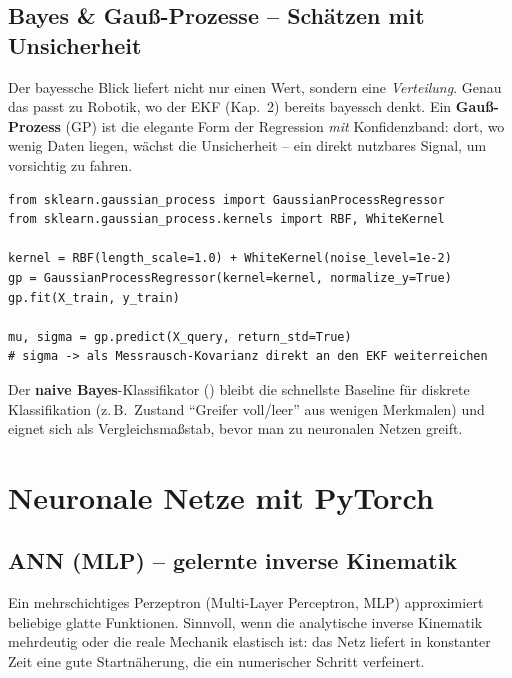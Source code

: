 \subsection{Bayes \& Gauß-Prozesse -- Schätzen mit Unsicherheit}
Der bayessche Blick liefert nicht nur einen Wert, sondern eine
\emph{Verteilung}. Genau das passt zu Robotik, wo der EKF (Kap.~2) bereits
bayessch denkt. Ein \textbf{Gauß-Prozess} (GP) ist die elegante Form der
Regression \emph{mit} Konfidenzband: dort, wo wenig Daten liegen, wächst die
Unsicherheit -- ein direkt nutzbares Signal, um vorsichtig zu fahren.

\begin{lstlisting}[style=py,caption={Gauß-Prozess-Regression mit Unsicherheit (sklearn)}]
from sklearn.gaussian_process import GaussianProcessRegressor
from sklearn.gaussian_process.kernels import RBF, WhiteKernel

kernel = RBF(length_scale=1.0) + WhiteKernel(noise_level=1e-2)
gp = GaussianProcessRegressor(kernel=kernel, normalize_y=True)
gp.fit(X_train, y_train)

mu, sigma = gp.predict(X_query, return_std=True)
# sigma -> als Messrausch-Kovarianz direkt an den EKF weiterreichen
\end{lstlisting}

\noindent Der \textbf{naive Bayes}-Klassifikator ()
bleibt die schnellste Baseline für diskrete Klassifikation (z.\,B.\ Zustand
``Greifer voll/leer'' aus wenigen Merkmalen) und eignet sich als
Vergleichsmaßstab, bevor man zu neuronalen Netzen greift.

\section{Neuronale Netze mit PyTorch}

\subsection{ANN (MLP) -- gelernte inverse Kinematik}
Ein mehrschichtiges Perzeptron (Multi-Layer Perceptron, MLP) approximiert
beliebige glatte Funktionen. Sinnvoll, wenn die analytische inverse Kinematik
mehrdeutig oder die reale Mechanik elastisch ist: das Netz liefert in
konstanter Zeit eine gute Startnäherung, die ein numerischer Schritt verfeinert.

